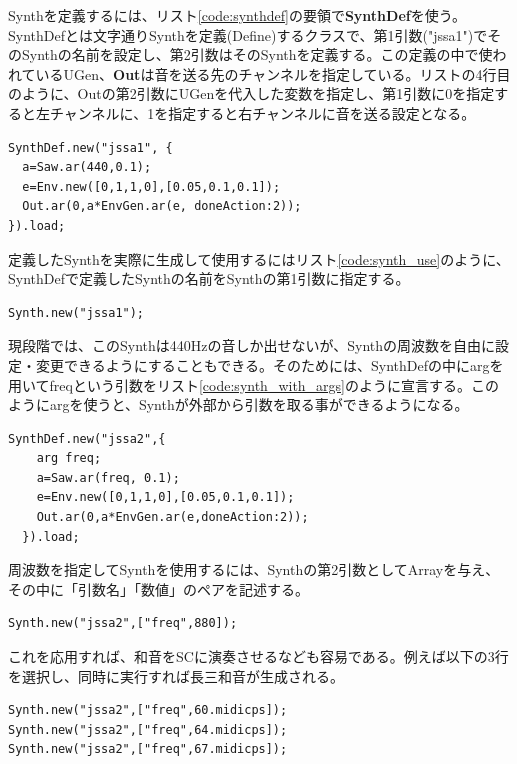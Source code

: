 \documentclass{jsarticle}
\begin{document}
Synthを定義するには、リスト\ref{code:synthdef}の要領で{\bf SynthDef}を使う。SynthDefとは文字通りSynthを定義(Define)するクラスで、第1引数("jssa1")でそのSynthの名前を設定し、第2引数はそのSynthを定義する。この定義の中で使われているUGen、{\bf Out}は音を送る先のチャンネルを指定している。リストの4行目のように、Outの第2引数にUGenを代入した変数を指定し、第1引数に0を指定すると左チャンネルに、1を指定すると右チャンネルに音を送る設定となる。

\begin{lstlisting}[caption=SynthDefの使用,label=code:synthdef]
SynthDef.new("jssa1", {
  a=Saw.ar(440,0.1);
  e=Env.new([0,1,1,0],[0.05,0.1,0.1]);
  Out.ar(0,a*EnvGen.ar(e, doneAction:2));
}).load;
\end{lstlisting}

定義したSynthを実際に生成して使用するにはリスト\ref{code:synth_use}のように、SynthDefで定義したSynthの名前をSynthの第1引数に指定する。
\begin{lstlisting}[caption=定義したSynthを使う,label=code:synth_use]
Synth.new("jssa1");
\end{lstlisting}

現段階では、このSynthは440Hzの音しか出せないが、Synthの周波数を自由に設定・変更できるようにすることもできる。そのためには、SynthDefの中にargを用いてfreqという引数をリスト\ref{code:synth_with_args}のように宣言する。このようにargを使うと、Synthが外部から引数を取る事ができるようになる。

\begin{lstlisting}[caption=SynthDefの使用法,label=code:synth_with_args]
  SynthDef.new("jssa2",{
    arg freq;
    a=Saw.ar(freq, 0.1);
    e=Env.new([0,1,1,0],[0.05,0.1,0.1]);
    Out.ar(0,a*EnvGen.ar(e,doneAction:2));
  }).load;
\end{lstlisting}

周波数を指定してSynthを使用するには、Synthの第2引数としてArrayを与え、その中に「引数名」「数値」のペアを記述する。

\begin{lstlisting}[caption=argの指定,label=code:synth_with_args_use]
Synth.new("jssa2",["freq",880]);
\end{lstlisting}

これを応用すれば、和音をSCに演奏させるなども容易である。例えば以下の3行を選択し、同時に実行すれば長三和音が生成される。
\begin{lstlisting}[caption=和音,label=code:chord]
Synth.new("jssa2",["freq",60.midicps]);
Synth.new("jssa2",["freq",64.midicps]);
Synth.new("jssa2",["freq",67.midicps]);
\end{lstlisting}
\end{document}
